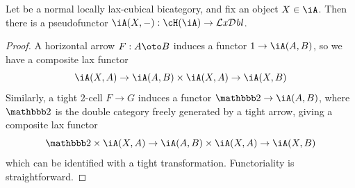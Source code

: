 \documentclass{amsart}
\def\lxdbl{\ensuremath{\mathcal{L}\mathit{x}\mathcal{D}\mathit{bl}}\xspace}
\begin{document}


\begin{lem}\label{thm:intercat-bicat}
  Let \iA be a normal locally lax-cubical bicategory, and fix an object $X\in\iA$.
  Then there is a pseudofunctor $\iA(X,-) : \cH(\iA) \to \lxdbl$.
\end{lem}
\begin{proof}
  A horizontal arrow $F:A\oto B$ induces a functor $1\to \iA(A,B)$, so we have a composite lax functor
  \[ \iA(X,A) \to \iA(A,B) \times \iA(X,A) \to \iA(X,B) \]
  Similarly, a tight 2-cell $F\to G$ induces a functor $\dtwo \to \iA(A,B)$, where $\dtwo$ is the double category freely generated by a tight arrow, giving a composite lax functor
  \[ \dtwo\times \iA(X,A) \to \iA(A,B) \times \iA(X,A) \to \iA(X,B) \]
  which can be identified with a tight transformation.
  Functoriality is straightforward.
\end{proof}
\end{document}
